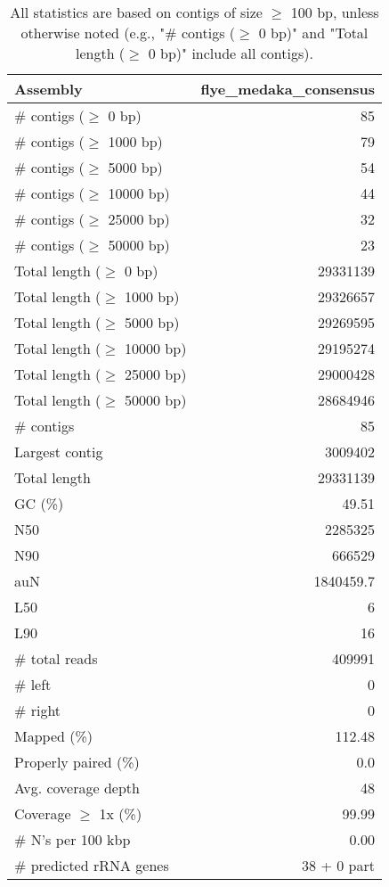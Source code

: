 \documentclass[12pt,a4paper]{article}
\begin{document}
\begin{table}[ht]
\begin{center}
\caption{All statistics are based on contigs of size $\geq$ 100 bp, unless otherwise noted (e.g., "\# contigs ($\geq$ 0 bp)" and "Total length ($\geq$ 0 bp)" include all contigs).}
\begin{tabular}{|l*{1}{|r}|}
\hline
Assembly & flye\_medaka\_consensus \\ \hline
\# contigs ($\geq$ 0 bp) & 85 \\ \hline
\# contigs ($\geq$ 1000 bp) & 79 \\ \hline
\# contigs ($\geq$ 5000 bp) & 54 \\ \hline
\# contigs ($\geq$ 10000 bp) & 44 \\ \hline
\# contigs ($\geq$ 25000 bp) & 32 \\ \hline
\# contigs ($\geq$ 50000 bp) & 23 \\ \hline
Total length ($\geq$ 0 bp) & 29331139 \\ \hline
Total length ($\geq$ 1000 bp) & 29326657 \\ \hline
Total length ($\geq$ 5000 bp) & 29269595 \\ \hline
Total length ($\geq$ 10000 bp) & 29195274 \\ \hline
Total length ($\geq$ 25000 bp) & 29000428 \\ \hline
Total length ($\geq$ 50000 bp) & 28684946 \\ \hline
\# contigs & 85 \\ \hline
Largest contig & 3009402 \\ \hline
Total length & 29331139 \\ \hline
GC (\%) & 49.51 \\ \hline
N50 & 2285325 \\ \hline
N90 & 666529 \\ \hline
auN & 1840459.7 \\ \hline
L50 & 6 \\ \hline
L90 & 16 \\ \hline
\# total reads & 409991 \\ \hline
\# left & 0 \\ \hline
\# right & 0 \\ \hline
Mapped (\%) & 112.48 \\ \hline
Properly paired (\%) & 0.0 \\ \hline
Avg. coverage depth & 48 \\ \hline
Coverage $\geq$ 1x (\%) & 99.99 \\ \hline
\# N's per 100 kbp & 0.00 \\ \hline
\# predicted rRNA genes & 38 + 0 part \\ \hline
\end{tabular}
\end{center}
\end{table}
\end{document}
